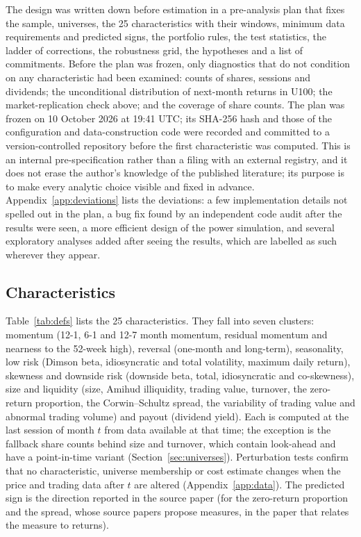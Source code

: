 \documentclass[11pt]{article}
\begin{document}
The design was written down before estimation in a pre-analysis plan that fixes the sample, universes, the 25
characteristics with their windows, minimum data requirements and predicted signs, the portfolio rules, the test
statistics, the ladder of corrections, the robustness grid, the hypotheses and a list of commitments. Before the plan
was frozen, only diagnostics that do not condition on any characteristic had been examined: counts of shares,
sessions and dividends; the unconditional distribution of next-month returns in U100; the market-replication check
above; and the coverage of share counts. The plan was frozen on 10 October 2026 at 19:41 UTC; its SHA-256 hash and
those of the configuration and data-construction code were recorded and committed to a version-controlled repository
before the first characteristic was computed. This is an internal pre-specification rather than a filing with an
external registry, and it does not erase the author's knowledge of the published literature; its purpose is to make
every analytic choice visible and fixed in advance. Appendix~\ref{app:deviations} lists the deviations: a few
implementation details not spelled out in the plan, a bug fix found by an independent code audit after the results
were seen, a more efficient design of the power simulation, and several exploratory analyses added after seeing the
results, which are labelled as such wherever they appear.

\subsection{Characteristics}

Table~\ref{tab:defs} lists the 25 characteristics. They fall into seven clusters: momentum (12-1, 6-1 and 12-7 month
momentum, residual momentum and nearness to the 52-week high), reversal (one-month and long-term), seasonality, low
risk (Dimson beta, idiosyncratic and total volatility, maximum daily return), skewness and downside risk (downside
beta, total, idiosyncratic and co-skewness), size and liquidity (size, Amihud illiquidity, trading value, turnover,
the zero-return proportion, the Corwin--Schultz spread, the variability of trading value and abnormal trading volume)
and payout (dividend yield). Each is computed at the last session of month $t$ from data available at that time; the
exception is the fallback share counts behind size and turnover, which contain look-ahead and have a point-in-time
variant (Section~\ref{sec:universes}). Perturbation tests confirm that no characteristic, universe membership or cost
estimate changes when the price and trading data after $t$ are altered (Appendix~\ref{app:data}). The predicted sign is
the direction reported in the source paper (for the zero-return proportion and the spread, whose source papers propose
measures, in the paper that relates the measure to returns).
\end{document}
